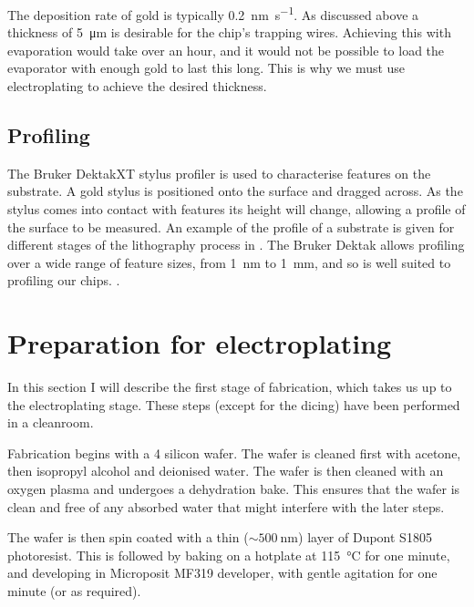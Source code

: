 The deposition rate of gold is typically \SI{0.2}{\nano\meter\per\second}.
%
%
As discussed above a thickness of \SI{5}{\micro\meter} is desirable for the
chip's trapping wires. Achieving this with evaporation would take over an hour,
and it would not be possible to load the evaporator with enough gold to last
this long. This is why we must use electroplating to achieve the desired
thickness.

\subsection{Profiling}
\label{fab:profile}

The Bruker DektakXT stylus profiler is used to characterise features on the
substrate. A gold stylus is positioned onto the surface and dragged across. As
the stylus comes into contact with features its height will change, allowing a
profile of the surface to be measured. An example of the profile of a substrate
is given for different stages of the lithography process in
. The Bruker Dektak allows profiling over a wide
range of feature sizes, from \SI{1}{\nano\meter} to \SI{1}{\milli\meter}, and
so is well suited to profiling our chips.
%
.


\section{Preparation for electroplating}
\label{fab:prep}

In this section I will describe the first stage of fabrication, which takes us
up to the electroplating stage. These steps (except for the dicing) have been
performed in a cleanroom.

Fabrication begins with a \SI{4}{\inch} silicon wafer. The wafer is cleaned first
with acetone, then isopropyl alcohol and deionised water. The wafer is then
cleaned with an oxygen plasma and undergoes a dehydration bake.  This ensures
that the wafer is clean and free of any absorbed water that might
interfere with the later steps.

The wafer is then spin coated with a thin ($\sim\SI{500}{\nano\meter}$) layer
of Dupont S1805 photoresist. This is followed by baking on a hotplate at
\SI{115}{\celsius} for one minute, and developing in Microposit MF319
developer, with gentle agitation for one minute (or as required).

